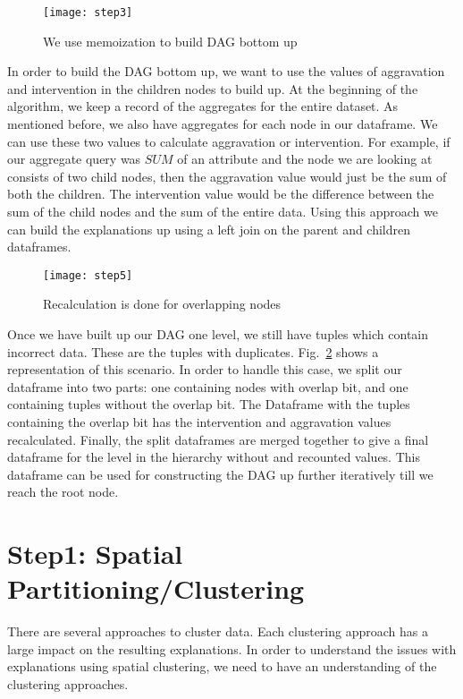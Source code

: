 \begin{figure}[h]
\texttt{[image: step3]}
\caption{We use memoization to build DAG bottom up}
\label{fig:step3}
\end{figure}

In order to build the DAG bottom up, we want to use the values of aggravation and intervention in the children nodes to build up. At the beginning of the algorithm, we keep a record of the aggregates for the entire dataset. As mentioned before, we also have aggregates for each node in our dataframe. We can use these two values to calculate aggravation or intervention. For example, if our aggregate query was $SUM$ of an attribute and the node we are looking at consists of two child nodes, then the aggravation value would just be the sum of both the children. The intervention value would be the difference between the sum of the child nodes and the sum of the entire data. Using this approach we can build the explanations up using a left join on the parent and children dataframes.

\begin{figure}[h]
\texttt{[image: step5]}
\caption{Recalculation is done for overlapping nodes}
\label{fig:step4}
\end{figure}

Once we have built up our DAG one level, we still have tuples which contain incorrect data. These are the tuples with duplicates. Fig.~\ref{fig:step4} shows a representation of this scenario. In order to handle this case, we split our dataframe into two parts: one containing nodes with overlap bit, and one containing tuples without the overlap bit. The Dataframe with the tuples containing the overlap bit has the intervention and aggravation values recalculated. Finally, the split dataframes are merged together to give a final dataframe for the level in the hierarchy without and recounted values. This dataframe can be used for constructing the DAG up further iteratively till we reach the root node.

\section{Step1: Spatial Partitioning/Clustering}
There are several approaches to cluster data. Each clustering approach has a large impact on the resulting explanations. In order to understand the issues with explanations using spatial clustering, we need to have an understanding of the clustering approaches.

